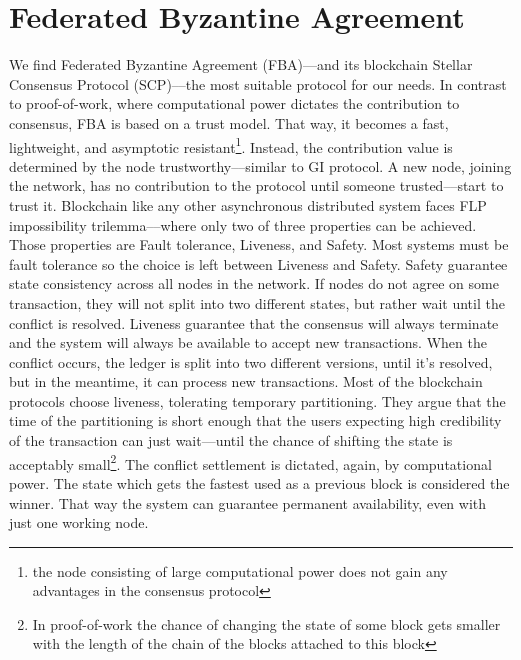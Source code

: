 \section{Federated Byzantine Agreement}
\label{FBA}
We find Federated Byzantine Agreement (FBA)––and its blockchain Stellar Consensus Protocol (SCP)\cite{mazieres2015stellar}––the most suitable protocol for our needs. In contrast to proof-of-work, where computational power dictates the contribution to consensus, FBA is based on a trust model. That way, it becomes a fast, lightweight, and asymptotic resistant\footnote{the node consisting of large computational power does not gain any advantages in the consensus protocol}. Instead, the contribution value is determined by the node trustworthy––similar to GI protocol. A new node, joining the network, has no contribution to the protocol until someone trusted––start to trust it.
Blockchain like any other asynchronous distributed system faces FLP\cite{fischer1985impossibility} impossibility trilemma––where only two of three properties can be achieved. Those properties are Fault tolerance, Liveness, and Safety. Most systems must be fault tolerance so the choice is left between Liveness and Safety. Safety guarantee state consistency across all nodes in the network. If nodes do not agree on some transaction, they will not split into two different states, but rather wait until the conflict is resolved. Liveness guarantee that the consensus will always terminate and the system will always be available to accept new transactions. When the conflict occurs, the ledger is split into two different versions, until it's resolved, but in the meantime, it can process new transactions. Most of the blockchain protocols choose liveness, tolerating temporary partitioning. They argue that the time of the partitioning is short enough that the users expecting high credibility of the transaction can just wait---until the chance of shifting the state is acceptably small\footnote{In proof-of-work the chance of changing the state of some block gets smaller with the length of the chain of the blocks attached to this block}. The conflict settlement is dictated, again, by computational power. The state which gets the fastest used as a previous block is considered the winner. That way the system can guarantee permanent availability, even with just one working node. 


